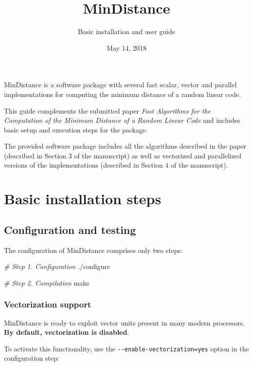 \documentclass[]{article}
\title{MinDistance}
\author{Basic installation and user guide}
\date{May 14, 2018}
\newenvironment{Shaded}{}{}
\newcommand{\CommentTok}[1]{\textcolor[rgb]{0.38,0.63,0.69}{\textit{#1}}}
\newcommand{\ExtensionTok}[1]{#1}
\newcommand{\FunctionTok}[1]{\textcolor[rgb]{0.02,0.16,0.49}{#1}}
\begin{document}
\maketitle

MinDistance is a software package with several fast scalar, vector and
parallel implementations for computing the minimum distance of a random
linear code.

This guide complements the submitted paper \emph{Fast Algorithms for the
Computation of the Minimum Distance of a Random Linear Code} and
includes basic setup and execution steps for the package.

The provided software package includes all the algorithms described in
the paper (described in Section 3 of the manuscript) as well as
vectorized and parallelized versions of the implementations (described
in Section 4 of the manuscript).

\hypertarget{basic-installation-steps}{%
\section{Basic installation steps}\label{basic-installation-steps}}

\hypertarget{configuration-and-testing}{%
\subsection{Configuration and testing}\label{configuration-and-testing}}

The configuration of MinDistance comprises only two steps:

\begin{Shaded}
\begin{Highlighting}[]
\CommentTok{# Step 1. Configuration}
\ExtensionTok{./configure}

\CommentTok{# Step 2. Compilation}
\FunctionTok{make}
\end{Highlighting}
\end{Shaded}

\hypertarget{vectorization-support}{%
\subsubsection{Vectorization support}\label{vectorization-support}}

MinDistance is ready to exploit vector units present in many modern
processors. \textbf{By default, vectorization is disabled}.

To activate this functionality, use the
\texttt{-\/-enable-vectorization=yes} option in the configuration step:
\end{document}
